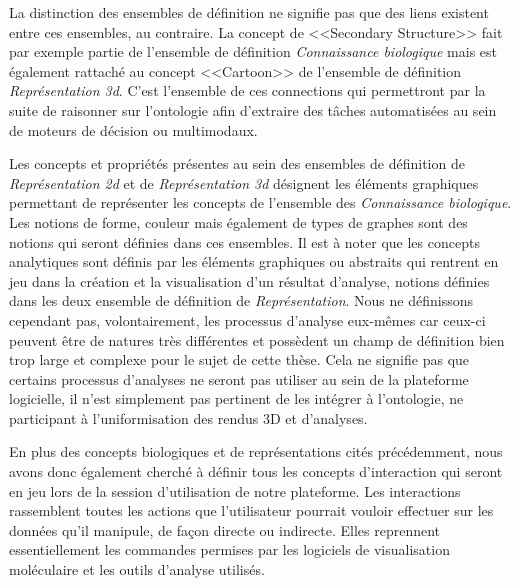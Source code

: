 La distinction des ensembles de définition ne signifie pas que des liens existent entre ces ensembles, au contraire. La concept de <<Secondary Structure>> fait par exemple partie de l'ensemble de définition \textit{Connaissance biologique} mais est également rattaché au concept <<Cartoon>> de l'ensemble de définition \textit{Représentation 3d}. C'est l'ensemble de ces connections qui permettront par la suite de raisonner sur l'ontologie afin d'extraire des tâches automatisées au sein de moteurs de décision ou multimodaux.

Les concepts et propriétés présentes au sein des ensembles de définition de \textit{Représentation 2d} et de \textit{Représentation 3d} désignent les éléments graphiques permettant de représenter les concepts de l'ensemble des \textit{Connaissance biologique}. Les notions de forme, couleur mais également de types de graphes sont des notions qui seront définies dans ces ensembles. 
Il est à noter que les concepts analytiques sont définis par les éléments graphiques ou abstraits qui rentrent en jeu dans la création et la visualisation d'un résultat d'analyse, notions définies dans les deux ensemble de définition de \textit{Représentation}. Nous ne définissons cependant pas, volontairement, les processus d'analyse eux-mêmes car ceux-ci peuvent être de natures très différentes et possèdent un champ de définition bien trop large et complexe pour le sujet de cette thèse. Cela ne signifie pas que certains processus d'analyses ne seront pas utiliser au sein de la plateforme logicielle, il n'est simplement pas pertinent de les intégrer à l'ontologie, ne participant à l'uniformisation des rendus 3D et d'analyses.

En plus des concepts biologiques et de représentations cités précédemment, nous avons donc également cherché à définir tous les concepts d'interaction qui seront en jeu lors de la session d'utilisation de notre plateforme. Les interactions rassemblent toutes les actions que l'utilisateur pourrait vouloir effectuer sur les données qu'il manipule, de façon directe ou indirecte. Elles reprennent essentiellement les commandes permises par les logiciels de visualisation moléculaire et les outils d'analyse utilisés.

